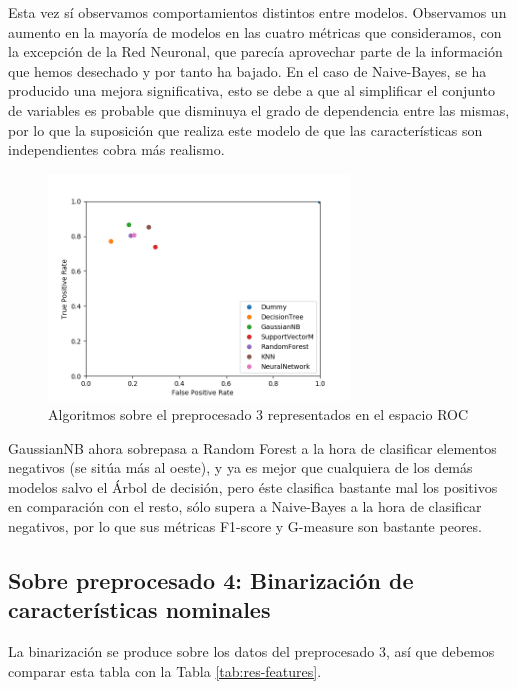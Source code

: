 \documentclass{article}
\begin{document}
Esta vez sí observamos comportamientos distintos entre modelos.
Observamos un aumento en la mayoría de modelos en las cuatro métricas
que consideramos, con la excepción de la Red Neuronal, que parecía
aprovechar parte de la información que hemos desechado y por tanto ha
bajado. En el caso de Naive-Bayes, se ha producido una mejora
significativa, esto se debe a que al simplificar el conjunto de
variables es probable que disminuya el grado de dependencia entre las
mismas, por lo que la suposición que realiza este modelo de que las
características son independientes cobra más realismo.

\begin{figure}[H]
  \centering
  \label{fig:roc3}
  \caption{Algoritmos sobre el preprocesado 3 representados en el espacio ROC}
  \includegraphics[width=80mm]{figures/roc3}
\end{figure}

GaussianNB ahora sobrepasa a Random Forest a la hora de clasificar
elementos negativos (se sitúa más al oeste), y ya es mejor que
cualquiera de los demás modelos salvo el Árbol de decisión, pero éste
clasifica bastante mal los positivos en comparación con el resto, sólo
supera a Naive-Bayes a la hora de clasificar negativos, por lo que sus
métricas F1-score y G-measure son bastante peores.

\subsection{Sobre preprocesado 4: Binarización de características
  nominales}

La binarización se produce sobre los datos del preprocesado 3, así que
debemos comparar esta tabla con la Tabla \ref{tab:res-features}.
\end{document}
